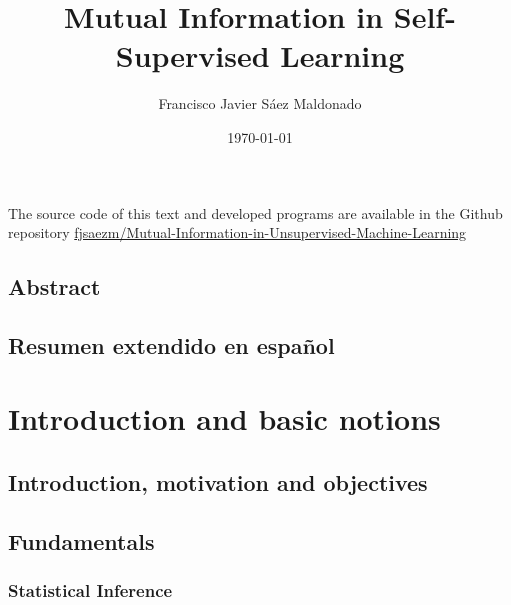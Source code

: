 \documentclass[oneside,openright,titlepage,numbers=noenddot,openany,headinclude,footinclude=true, cleardoublepage=empty,abstractoff,BCOR=5mm,paper=a4,fontsize=11pt, dvipsnames,table,xcdraw]{scrreprt}
\author{Francisco Javier Sáez Maldonado}
\date{\today}
\title{Mutual Information in Self-Supervised Learning}
\begin{document}
\maketitle


\vspace*{\fill}
\doclicenseThis
The source code of this text and developed programs are available in the Github repository \href{https://github.com/fjsaezm/Mutual-Information-in-Unsupervised-Machine-Learning}{fjsaezm/Mutual-Information-in-Unsupervised-Machine-Learning}

\chapter*{Abstract}

\chapter*{Resumen extendido en español}

\newpage


\tableofcontents
\newpage
\listoffigures
\listoftables

\newpage

\part{Introduction and basic notions}
\chapter{Introduction, motivation and objectives}

\clearpage
\chapter{Fundamentals}


\clearpage
\section{Statistical Inference}

\end{document}
